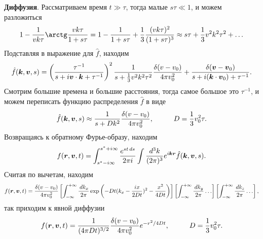 \textbf{Диффузия}. Рассматриваем время $t \gg \tau$, тогда малые $s \tau \ll 1$, и можем разложиться
\begin{equation*}
	1 - \frac{1}{vk\tau} \arctg \frac{v k \tau}{1 + s \tau} = 1 - \frac{1}{1 + s \tau} + \frac{1}{3} \frac{(v k \tau)^2}{(1+s \tau)^3} \approx s \tau + \frac{1}{3} v^2 k^2 \tau^2 + \ldots 
\end{equation*}
Подставляя в выражение для $\hat{f}$, находим
\begin{equation*}
	\hat{f}(\boldsymbol{k}, \boldsymbol{v}, s) =  \left(
		\frac{\tau^{-1}}{s + i \boldsymbol{v} \cdot \boldsymbol{k} + \tau^{-1}} 
	\right)^2 \frac{1}{s + \frac{1}{3} v^2 k^2 \tau^2}  \frac{\delta(v-v_0)}{4 \pi v_0^2} + \frac{\delta(\boldsymbol{v}-\boldsymbol{v}_0)}{s + i (\boldsymbol{k} \cdot \boldsymbol{v}_0) + \tau^{-1}}.
\end{equation*}
Смотрим большие времена и большие расстояния, тогда самое большое это $\tau^{-1}$, и можем переписать функцию распределения $\hat{f}$ в виде
\begin{equation*}
	\hat{f}(\vc{k}, \vc{v}, s) \approx \frac{1}{s + D k^2} \frac{\delta(v-v_0)}{4 \pi v_0^2},
	\hspace{10 mm} 
	D = \frac{1}{3} v_0^2 \tau.
\end{equation*}
Возвращаясь к обратному Фурье-образу, находим
\begin{equation*}
	f(\boldsymbol{r}, \boldsymbol{v}, t) = \int_{s^* - i \infty}^{s^* + i \infty} \frac{e^{st \, d s}}{2 \pi i} \int \frac{d^3 k}{(2\pi)^3} e^{i \boldsymbol{k} \boldsymbol{r}} \hat{f}(\boldsymbol{k}, \boldsymbol{v}, s).
\end{equation*}
Считая по вычетам, находим
\begin{equation*}
	f(\boldsymbol{r}, \boldsymbol{v}, t) = \frac{\delta(v-v_0)}{4 \pi v_0^2} \left[
		\int_{-\infty}^{+\infty} \frac{\, d k_x}{2\pi}  \exp\left(
			- Dt( k_x - \frac{i x}{2 D t})^2 -\frac{x^2}{4 D t}
		\right)
	\right] \left[ \int_{-\infty}^{+\infty}  \frac{\, d k_y}{2\pi} \ldots \right] \left[ \int_{-\infty}^{+\infty}  \frac{\, d k_z}{2\pi} \ldots \right],
\end{equation*}
так приходим к явной диффузии
\begin{equation}
	f(\vc{r}, \vc{v}, t) =  \frac{1}{(4 \pi D t)^{3/2}}  \frac{\delta(v-v_0)}{4 \pi v_0^2} e^{-r^2/4Dt},
	\hspace{10 mm} 
	D = \frac{1}{3} v_0^2 \tau.
\end{equation}



